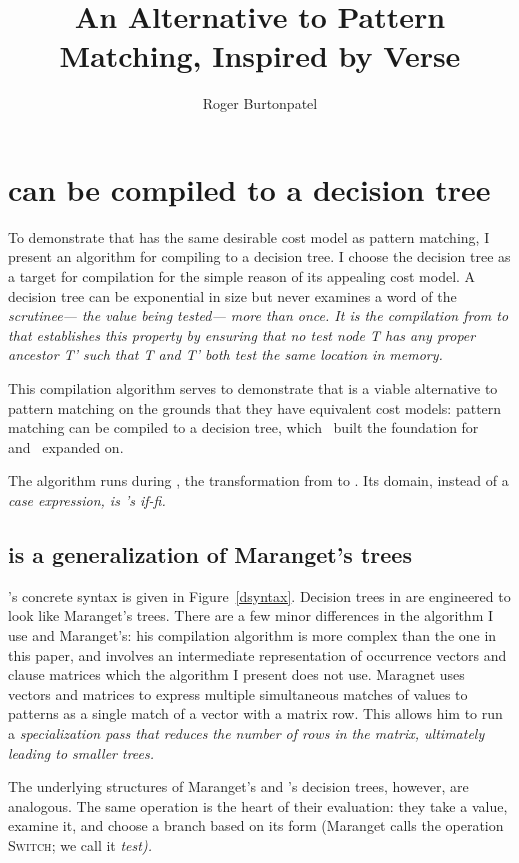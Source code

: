 \documentclass[manuscript,screen,review, 12pt, nonacm]{acmart}
\title{An Alternative to Pattern Matching, Inspired by Verse}
\author{Roger Burtonpatel}
\affiliation{%
\institution{Tufts University}
\streetaddress{419 Boston Ave}
  \city{Medford}
  \state{Massachusetts}
  \country{USA}
  \postcode{02155}
  }
\begin{document}
  

\section{\VMinus can be compiled to a decision tree}
\label{vminustod}
    To demonstrate that \VMinus has the same desirable cost model as pattern
    matching, I present an algorithm for compiling \VMinus to a decision tree. I
    choose the decision tree as a target for compilation for the simple reason
    of its appealing cost model. A decision tree can be exponential in size but
    never examines a word of the \it{scrutinee}--- the value being tested---
    more than once. It is the compilation from \VMinus to \D that establishes
    this property by ensuring that no \it{test} node \it{T} has any proper
    ancestor \it{T'} such that \it{T} and \it{T'} both test the same location in
    memory.   

    This compilation algorithm serves to demonstrate that \VMinus is a viable
    alternative to pattern matching on the grounds that they have equivalent
    cost models: pattern matching can be compiled to a decision tree,
    which~\citet{macqueen1985tree} built the foundation for and~\citet{maranget}
    expanded on. 

    The algorithm runs during \DTran, the transformation from \VMinus to \D. Its
    domain, instead of a \it{case} expression, is \VMinus's \it{if-fi}. 
       
    \subsection{\D is a generalization of Maranget's trees} 

  \D's concrete syntax is given in Figure~\ref{dsyntax}. Decision trees in \D
    are engineered to look like Maranget's trees. There are a few minor
    differences in the algorithm I use and Maranget's: his compilation algorithm
    is more complex than the one in this paper, and involves an intermediate
    representation of occurrence vectors and clause matrices which the algorithm
    I present does not use. Maragnet uses vectors and matrices to express
    multiple simultaneous matches of values to patterns as a single match of a
    vector with a matrix row. This allows him to run a \it{specialization} pass
    that reduces the number of rows in the matrix, ultimately leading to smaller
    trees.
    
        
    The underlying structures of Maranget's and \D's decision trees, however,
    are analogous. The same operation is the heart of their evaluation: they
    take a value, examine it, and choose a branch based on its form (Maranget
    calls the operation \textsc{Switch}; we call it \it{test}). 
\end{document}
